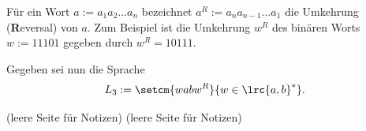 \begin{questions}
	\clearpage
	\question
	Für ein Wort $a := a_1a_2\ldots a_n$ bezeichnet $a^R := a_na_{n-1}\ldots a_1$ die Umkehrung (\textbf{R}eversal) von
	$a$. Zum Beispiel ist die Umkehrung $w^R$ des binären Worts $w := 11101$ gegeben durch $w^R = 10111$.

	Gegeben sei nun die Sprache
	\begin{align*}
		L_3 := \setcm{wabw^R}{w\in\lrc{a,b}^*}.
	\end{align*}
	\droptotalpoints

\end{questions}


\clearpage
(leere Seite für Notizen)
\clearpage
(leere Seite für Notizen)
